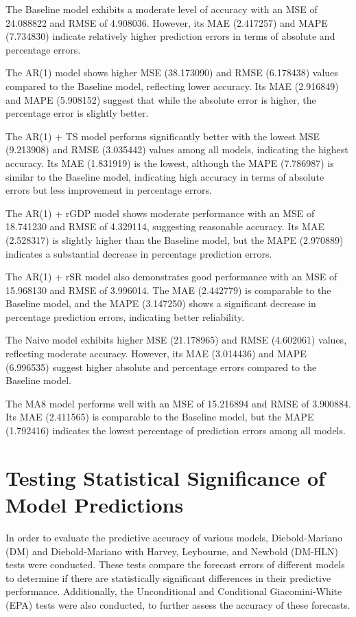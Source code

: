 \documentclass[12pt]{article}
\begin{document}
The Baseline model exhibits a moderate level of accuracy with an MSE of 24.088822 and RMSE of 4.908036. However, its MAE (2.417257) and MAPE (7.734830) indicate relatively higher prediction errors in terms of absolute and percentage errors.

The AR(1) model shows higher MSE (38.173090) and RMSE (6.178438) values compared to the Baseline model, reflecting lower accuracy. Its MAE (2.916849) and MAPE (5.908152) suggest that while the absolute error is higher, the percentage error is slightly better.

The AR(1) + TS model performs significantly better with the lowest MSE (9.213908) and RMSE (3.035442) values among all models, indicating the highest accuracy. Its MAE (1.831919) is the lowest, although the MAPE (7.786987) is similar to the Baseline model, indicating high accuracy in terms of absolute errors but less improvement in percentage errors.

The AR(1) + rGDP model shows moderate performance with an MSE of 18.741230 and RMSE of 4.329114, suggesting reasonable accuracy. Its MAE (2.528317) is slightly higher than the Baseline model, but the MAPE (2.970889) indicates a substantial decrease in percentage prediction errors.

The AR(1) + rSR model also demonstrates good performance with an MSE of 15.968130 and RMSE of 3.996014. The MAE (2.442779) is comparable to the Baseline model, and the MAPE (3.147250) shows a significant decrease in percentage prediction errors, indicating better reliability.

The Naive model exhibits higher MSE (21.178965) and RMSE (4.602061) values, reflecting moderate accuracy. However, its MAE (3.014436) and MAPE (6.996535) suggest higher absolute and percentage errors compared to the Baseline model.

The MA8 model performs well with an MSE of 15.216894 and RMSE of 3.900884. Its MAE (2.411565) is comparable to the Baseline model, but the MAPE (1.792416) indicates the lowest percentage of prediction errors among all models.


\section{Testing Statistical Significance of Model Predictions}

In order to evaluate the predictive accuracy of various models, Diebold-Mariano (DM) and Diebold-Mariano with Harvey, Leybourne, and Newbold (DM-HLN) tests were conducted. These tests compare the forecast errors of different models to determine if there are statistically significant differences in their predictive performance. Additionally, the Unconditional and Conditional Giacomini-White (EPA) tests were also conducted, to further assess the accuracy of these forecasts.
\end{document}

